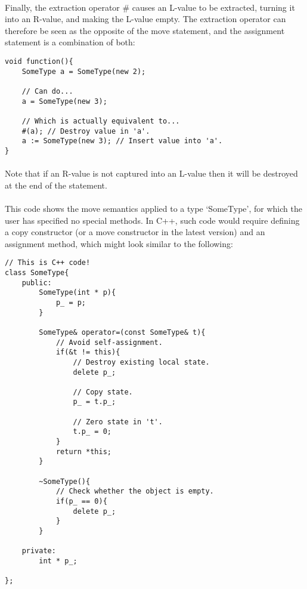 \documentclass[12pt,twoside,notitlepage]{report}
\begin{document}
\paragraph{}
Finally, the extraction operator \# causes an L-value to be extracted, turning it into an R-value, and making the L-value empty. The extraction operator can therefore be seen as the opposite of the move statement, and the assignment statement is a combination of both:

\small{
\begin{verbatim}
void function(){
    SomeType a = SomeType(new 2);
    
    // Can do...
    a = SomeType(new 3);
    
    // Which is actually equivalent to...
    #(a); // Destroy value in 'a'.
    a := SomeType(new 3); // Insert value into 'a'.
}
\end{verbatim}
}

\paragraph{}
Note that if an R-value is not captured into an L-value then it will be destroyed at the end of the statement.

\paragraph{}
This code shows the move semantics applied to a type `SomeType', for which the user has specified no special methods. In C++, such code would require defining a copy constructor (or a move constructor in the latest version) and an assignment method, which might look similar to the following:

\small{
\begin{verbatim}
// This is C++ code!
class SomeType{
    public:
        SomeType(int * p){
            p_ = p;
        }
        
        SomeType& operator=(const SomeType& t){
            // Avoid self-assignment.
            if(&t != this){
                // Destroy existing local state.
                delete p_;
                
                // Copy state.
                p_ = t.p_;
                
                // Zero state in 't'.
                t.p_ = 0;
            }
            return *this;
        }
        
        ~SomeType(){
            // Check whether the object is empty.
            if(p_ == 0){
                delete p_;
            }
        }
    
    private:
        int * p_;
    
};
\end{verbatim}
}
\end{document}

